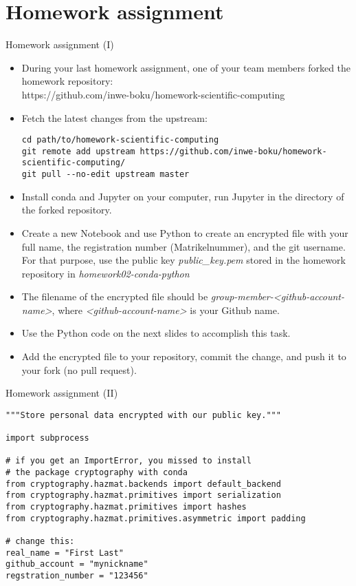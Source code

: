 
\section{Homework assignment}

\begin{frame}[fragile]{Homework assignment (I)}

	\begin{itemize}
		\item During your last homework assignment, one of your team members forked the homework repository:\\
            https://github.com/inwe-boku/homework-scientific-computing
		\item Fetch the latest changes from the upstream:
            {\scriptsize
            \begin{verbatim}
cd path/to/homework-scientific-computing
git remote add upstream https://github.com/inwe-boku/homework-scientific-computing/
git pull --no-edit upstream master\end{verbatim}
            }
		\item Install conda and Jupyter on your computer, run Jupyter in the directory of the
            forked repository.
		\item Create a new Notebook and use Python to create an encrypted file with your full name, the registration number (Matrikelnummer), and the git username. For that purpose, use the public key \textit{public\_key.pem} stored in the homework repository in \textit{homework02-conda-python}
		\item The filename of the encrypted file should be
            \textit{group-member-<github-account-name>}, where \textit{<github-account-name>} is
            your Github name.
		\item Use the Python code on the next slides to accomplish this task.
		\item Add the encrypted file to your repository, commit the change, and push it to your
            fork (no pull request).
	\end{itemize}


\end{frame}

\begin{frame}[fragile]{Homework assignment (II)}

	\begin{verbatim}
"""Store personal data encrypted with our public key."""

import subprocess

# if you get an ImportError, you missed to install
# the package cryptography with conda
from cryptography.hazmat.backends import default_backend
from cryptography.hazmat.primitives import serialization
from cryptography.hazmat.primitives import hashes
from cryptography.hazmat.primitives.asymmetric import padding

# change this:
real_name = "First Last"
github_account = "mynickname"
regstration_number = "123456"\end{verbatim}

\end{frame}

